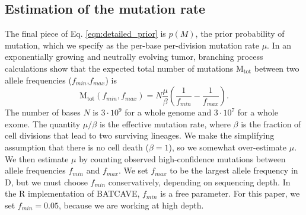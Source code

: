 \documentclass[a4,center,fleqn]{NAR}
\newcommand{\batcave}{BATCAVE\xspace}
\begin{document}
\subsection{Estimation of the mutation rate}
The final piece of Eq. \ref{eqn:detailed_prior} is $p(M)$, the prior probability of mutation, which we specify as the per-base per-division mutation rate $\mu$.
In an exponentially growing and neutrally evolving tumor, branching process calculations \cite{Williams2018} show that the expected total number of mutations $\mathrm{M_{tot}}$ between two allele frequencies ($f_{min}$,$f_{max}$) is
\begin{equation}
  \label{eqn:mut_rate}
  \mathrm{M_{tot}}(f_{min},f_{max}) = N\frac{\mu}{\beta}\left(\frac{1}{f_{min}} - \frac{1}{f_{max}}\right).
\end{equation}
The number of bases $N$ is $3\cdot10^9$ for a whole genome and $3\cdot10^7$ for a whole exome.
The quantity $\mu/\beta$ is the effective mutation rate, where $\beta$ is the fraction of cell divisions that lead to two surviving lineages.
We make the simplifying assumption that there is no cell death ($\beta = 1$), so we somewhat over-estimate $\mu$.
We then estimate $\mu$ by counting observed high-confidence mutations between allele frequencies $f_{min}$ and $f_{max}$.
We set $f_{max}$ to be the largest allele frequency in $\mathrm{D}$, but we must choose $f_{min}$ conservatively, depending on sequencing depth.
In the R implementation of \batcave, $f_{min}$ is a free parameter.
For this paper, we set $f_{min} = 0.05$, because we are working at high depth.
\end{document}
